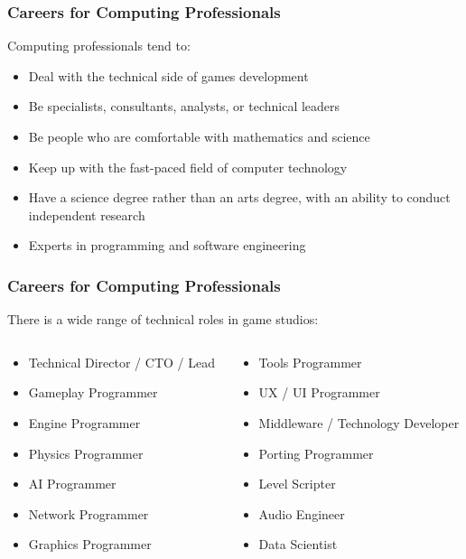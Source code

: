 \begin{frame}
	\frametitle{Careers for Computing Professionals}
	
	Computing professionals tend to:
	
	\begin{itemize}
		\item Deal with the technical side of games development \pause
		\item Be specialists, consultants, analysts, or technical leaders \pause
		\item Be people who are comfortable with mathematics and science \pause
		\item Keep up with the fast-paced field of computer technology \pause
		\item Have a science degree rather than an arts degree, with an ability to conduct independent research
		\item Experts in programming and software engineering
	\end{itemize}
\end{frame}

\begin{frame}
	\frametitle{Careers for Computing Professionals}
	
	There is a wide range of technical roles in game studios:
	
	\begin{columns}
		\begin{column}{0.5\textwidth}
			\begin{itemize}
				\item Technical Director / CTO / Lead
				\item Gameplay Programmer
				\item Engine Programmer
				\item Physics Programmer
				\item AI Programmer
				\item Network Programmer
				\item Graphics Programmer
			\end{itemize}
		\end{column}
		\begin{column}{0.5\textwidth}
			\begin{itemize}
				\item Tools Programmer
				\item UX / UI Programmer
				\item Middleware / Technology Developer
				\item Porting Programmer
				\item Level Scripter
				\item Audio Engineer
				\item Data Scientist
			\end{itemize}
		\end{column}
	\end{columns}
\end{frame}

